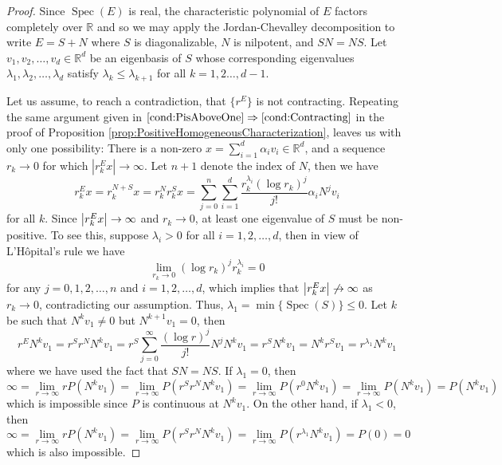 \documentclass[11pt, letter]{book}
\newcommand\Spec{\operatorname{Spec}}
\newcommand\R{\mathbb{R}}
\newcommand{\f}[2]{\frac{#1}{#2}}
\begin{document}
\begin{proof}
Since $\Spec(E)$ is real, the characteristic polynomial of $E$ factors completely over $\R$ and so we may apply the Jordan-Chevalley decomposition to write $E=S+N$ where $S$ is diagonalizable, $N$ is nilpotent, and $SN=NS$. Let $v_1,v_2,\dots,v_d \in \R^d$ be an eigenbasis of $S$ whose corresponding eigenvalues $\lambda_1,\lambda_2,\dots,\lambda_d$ satisfy $\lambda_k\leq \lambda_{k+1}$ for all $k=1,2\dots,d-1$.

Let us assume, to reach a contradiction, 
that $\{ r^E \}$ is not contracting. Repeating the same argument given in $\ref{cond:PisAboveOne}\Rightarrow\ref{cond:Contracting}$ in the proof of Proposition \ref{prop:PositiveHomogeneousCharacterization}, leaves us with only one possibility: There is a non-zero $x = \sum^d_{i=1}\alpha_i v_i \in\mathbb{R}^d$, and a sequence $r_k\to 0$ for which $|r_k^E x|\to\infty$. Let $n+1$ denote the index of $N$, then we have
\begin{equation*}
r^E_k x = r_k^{N+S} x 
= r_k^N r_k^S x 
= \sum_{j=0}^n\sum_{i=1}^d \f{r_k^{\lambda_i}(\log r_k)^j}{j!}   \alpha_iN^j v_i
\end{equation*}
for all $k$. Since $\abs{r_k^E x} \to \infty$ and $r_k \to 0$, at least one eigenvalue of $S$ must be non-positive. To see this, suppose $\lambda_i > 0$ for all $i = 1,2,\dots,d$, then in view of L'H\^{o}pital's rule we have
\begin{equation*}
    \lim_{r_k \to 0}(\log r_k)^j r_k^{\lambda_i} = 0  
\end{equation*}
for any $j =0, 1,2,\dots,n$ and $i =1,2,\dots,d$, which implies that $\abs{r^E_k x} \not\to \infty$ as $r_k \to 0$, contradicting our assumption. Thus, $\lambda_1 = \min\{ \Spec(S)\} \leq 0$. Let $k$ be such that $N^k v_1 \neq 0$ but $N^{k+1} v_1 = 0$, then
\begin{equation*}
    r^E N^k v_1 = r^S r^N N^k v_1 = r^S \sum_{j=0}^\infty \f{(\log r)^j}{j!}N^j N^k v_1 = r^S N^k v_1 = N^k r^S  v_1 =  r^{\lambda_{1}} N^k  v_1
\end{equation*}
where we have used the fact that $SN = NS$. If $\lambda_1= 0$, then 
\begin{equation*}
    \infty =  \lim_{r\to \infty} rP(N^k v_1)  = \lim_{r\to \infty} P( r^S r^N N^k v_1) =  \lim_{r\to \infty}P(r^{0} N^k v_1)= \lim_{r\to \infty}P( N^k v_1) = P(N^k v_1)
\end{equation*}
which is impossible since $P$ is continuous at $N^k v_1$. On the other hand, if $\lambda_1 < 0$, then
\begin{equation*}
    \infty = \lim_{r\to \infty} rP(N^k v_1) = \lim_{r\to \infty} P(r^S r^N N^k v_1) = \lim_{r\to \infty}P(r^{\lambda_1} N^k v_1) = P(0) = 0
\end{equation*}
which is also impossible. 
\end{proof}
\end{document}
